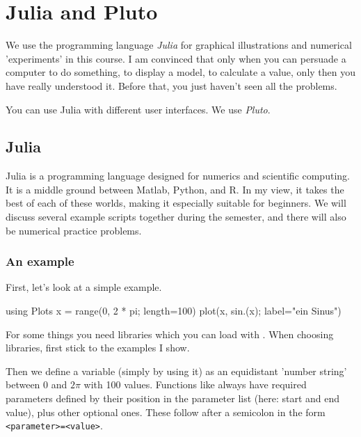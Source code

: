 \renewcommand{\lastmod}{April 15, 2024}
\renewcommand{\chapterauthors}{Markus Lippitz}




\chapter{Julia and Pluto}


We use the programming language \emph{Julia} for graphical illustrations and numerical 'experiments' in this course. I am convinced that only when you can persuade a computer to do something, to display a model, to calculate a value, only then you have really understood it. Before that, you just haven't seen all the problems.  

You can use Julia with different user interfaces. We use \emph{Pluto}.

\section{Julia}

Julia is a programming language designed for numerics and scientific computing. It is a middle ground between Matlab, Python, and R. In my view, it takes the best of each of these worlds, making it especially suitable for beginners. We will discuss several example scripts together during the semester, and there will also be numerical practice problems.


\subsection{An example}

First, let's look at a simple example.


\begin{jllisting}
using Plots
x = range(0, 2 * pi; length=100)
plot(x, sin.(x); label="ein Sinus")
\end{jllisting}

For some things you need libraries which you can load with . When choosing libraries, first stick to the examples I show.

Then we define a variable  (simply by using it) as an equidistant 'number string' between 0 and $2 \pi$ with 100 values. Functions like  always have required parameters defined by their position in the parameter list (here: start and end value), plus other optional ones. These follow after a semicolon in the form \texttt{<parameter>=<value>}.

